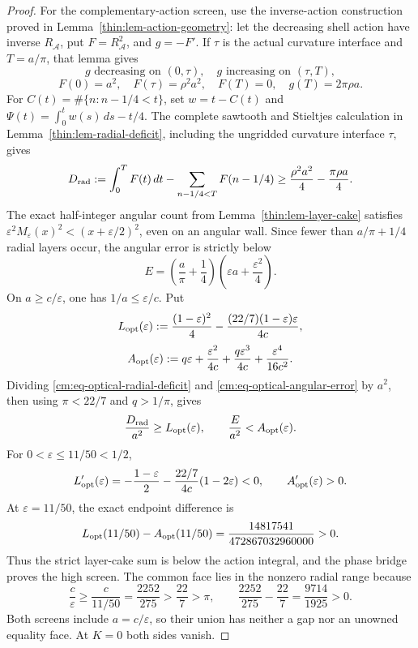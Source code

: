 \documentclass[11pt]{article}
\numberwithin{equation}{section}
\theoremstyle{definition}
\theoremstyle{remark}
\begin{document}
\begin{proof}
For the complementary-action screen, use the inverse-action construction
proved in Lemma~\ref{thin:lem-action-geometry}: let the decreasing shell
action have inverse \(R_{\mathcal A}\), put \(F=R_{\mathcal A}^2\), and
\(g=-F'\).  If \(\tau\) is the actual curvature interface and
\(T=a/\pi\), that lemma gives
\[
 g\text{ decreasing on }(0,\tau),\quad
 g\text{ increasing on }(\tau,T),
\]
\[
 F(0)=a^2,\quad F(\tau)=\rho^2a^2,\quad F(T)=0,\quad
 g(T)=2\pi\rho a.
\]
For \(C(t)=\#\{n:n-1/4<t\}\), set \(w=t-C(t)\) and
\(\Psi(t)=\int_0^tw(s)\,ds-t/4\).  The complete sawtooth and Stieltjes
calculation in Lemma~\ref{thin:lem-radial-deficit}, including the ungridded
curvature interface \(\tau\), gives
\begin{equation}
 D_{\rm rad}:=\int_0^TF(t)\,dt
 -\sum_{n-1/4<T}F(n-1/4)
 \geq\frac{\rho^2a^2}{4}-\frac{\pi\rho a}{4}.
 \label{cm:eq-optical-radial-deficit}
\end{equation}
The exact half-integer angular count from
Lemma~\ref{thin:lem-layer-cake} satisfies
\(\varepsilon^2M_\varepsilon(x)^2<(x+\varepsilon/2)^2\), even on an
angular wall.  Since fewer than \(a/\pi+1/4\) radial layers occur, the
angular error is strictly below
\begin{equation}
 E=\left(\frac a\pi+\frac14\right)
 \left(\varepsilon a+\frac{\varepsilon^2}{4}\right).
 \label{cm:eq-optical-angular-error}
\end{equation}
On \(a\geq c/\varepsilon\), one has \(1/a\leq\varepsilon/c\).  Put
\[
 L_{\rm opt}(\varepsilon)
 :=\frac{(1-\varepsilon)^2}{4}
 -\frac{(22/7)(1-\varepsilon)\varepsilon}{4c},
\]
\[
 A_{\rm opt}(\varepsilon)
 :=q\varepsilon+\frac{\varepsilon^2}{4c}
 +\frac{q\varepsilon^3}{4c}
 +\frac{\varepsilon^4}{16c^2}.
\]
Dividing \eqref{cm:eq-optical-radial-deficit} and
\eqref{cm:eq-optical-angular-error} by \(a^2\), then using
\(\pi<22/7\) and \(q>1/\pi\), gives
\[
 \frac{D_{\rm rad}}{a^2}\geq L_{\rm opt}(\varepsilon),
 \qquad
 \frac{E}{a^2}<A_{\rm opt}(\varepsilon).
\]
For \(0<\varepsilon\leq11/50<1/2\),
\[
 L_{\rm opt}'(\varepsilon)
 =-\frac{1-\varepsilon}{2}
 -\frac{22/7}{4c}(1-2\varepsilon)<0,
 \qquad
 A_{\rm opt}'(\varepsilon)>0.
\]
At \(\varepsilon=11/50\), the exact endpoint difference is
\begin{equation}
 L_{\rm opt}(11/50)-A_{\rm opt}(11/50)
 =\frac{14817541}{472867032960000}>0.
 \label{cm:eq-optical-high-reserve}
\end{equation}
Thus the strict layer-cake sum is below the action integral, and the phase
bridge proves the high screen.  The common face lies in the nonzero radial
range because
\[
 \frac c\varepsilon\geq\frac{c}{11/50}
 =\frac{2252}{275}>\frac{22}{7}>\pi,
 \qquad
 \frac{2252}{275}-\frac{22}{7}=\frac{9714}{1925}>0.
\]
Both screens include \(a=c/\varepsilon\), so their union has neither a gap
nor an unowned equality face.  At \(K=0\) both sides vanish.
\end{proof}
\end{document}
